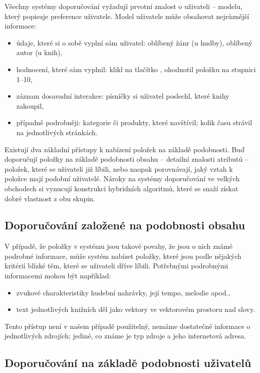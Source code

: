Všechny systémy doporučování vyžadují prvotní znalost o uživateli -- modelu, který popisuje preference uživatele.
Model uživatele může obsahovat nejrůznější informace:
\begin{itemize}
    \item údaje, které si o sobě vyplní sám uživatel: oblíbený žánr (u hudby), oblíbený autor (u knih),
    \item hodnocení, které sám vyplnil: klikl na tlačítko , ohodnotil položku na stupnici 1--10,
    \item záznam dosavadní interakce: písníčky si uživatel poslechl, které knihy zakoupil,
	\item případně podrobněji: kategorie či produkty, které navštívil; kolik času strávil na jednotlivých stránkách.
\end{itemize}

Existují dva základní přístupy k nabízení položek na základě podobnosti.
Buď doporučují položky na základě podobnosti obsahu -- detailní znalosti atributů -- položek, které se uživateli již líbili,
nebo naopak porovnávají, jaký vztah k položce mají podobní uživatelé.
Nároky na systémy doporučování ve velkých obchodech si vynucují konstrukci hybridních algoritmů, které se snaží získat dobré vlastnost z obu skupin.

\subsection{Doporučování založené na podobnosti obsahu}

V případě, že položky v systému jsou takové povahy, že jsou o nich známé podrobné informace, může systém nabízet položky, které jsou podle nějakých kritérií blízké těm, které se uživateli dříve líbili.
Potřebnými podrobnými informacemi mohou být například:
\begin{itemize}
    \item zvukové charakteristiky hudební nahrávky, její tempo, melodie apod.,
    \item text jednotlivých knižních děl jako vektory ve vektorovém prostoru nad slovy.
\end{itemize}

Tento přístup není v našem případě použitelný, nemáme dostatečné informace o jednotlivých zdrojích; jediné, co známe je typ zdroje a jeho internetová adresa.

\subsection{Doporučování na základě podobnosti uživatelů}

